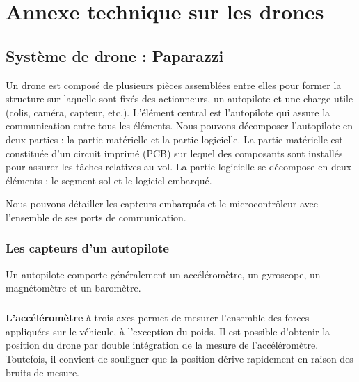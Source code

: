 \chapter*{Annexe technique sur les drones}


\renewcommand{\thefigure}{A.\arabic{figure}}
\setcounter{figure}{0} %

\renewcommand{\thetable}{A.\arabic{table}}
\setcounter{table}{0} %

\section*{Système de drone : Paparazzi}

Un drone est composé de plusieurs pièces assemblées entre elles pour former la structure sur laquelle sont fixés des actionneurs, un autopilote et une charge utile (colis, caméra, capteur, etc.). L'élément central est l'autopilote qui assure la communication entre tous les éléments. Nous pouvons décomposer l'autopilote en deux parties : la partie matérielle et la partie logicielle.
La partie matérielle est constituée d'un circuit imprimé (PCB) sur lequel des composants sont installés pour assurer les tâches relatives au vol. La partie logicielle se décompose en deux éléments : le segment sol et le logiciel embarqué.

Nous pouvons détailler les capteurs embarqués et le microcontrôleur avec l'ensemble de ses ports de communication. 

 \subsection*{Les capteurs d'un autopilote}
 Un autopilote comporte généralement un accéléromètre, un gyroscope, un magnétomètre et un baromètre.
 
 \paragraph*{}
 \textbf{L'accéléromètre} à trois axes permet de mesurer l'ensemble des forces appliquées sur le véhicule, à l'exception du poids. Il est possible d'obtenir la position du drone par double intégration de la mesure de l'accéléromètre. Toutefois, il convient de souligner que la position dérive rapidement en raison des bruits de mesure.

